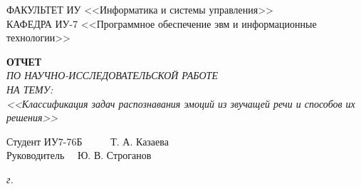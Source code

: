 \begin{titlepage}
	{
		\small \raggedright
		ФАКУЛЬТЕТ ИУ <<Информатика и системы управления>> \\
		\vspace{3.3mm}
		КАФЕДРА ИУ-7 <<Программное обеспечение эвм и информационные технологии>> \\
	}

	\vspace{15.8mm}

	{
		\LARGE \bfseries
		ОТЧЕТ \\
	}
	\vspace{5mm}
	{
		\Large \itshape
		ПО НАУЧНО-ИССЛЕДОВАТЕЛЬСКОЙ РАБОТЕ \\
		\vspace{5mm}
		НА ТЕМУ: \\
		<<Классификация задач распознавания эмоций из звучащей речи и способов их решения>> \\
	}

	\vfill

	Студент \hspace*{2.5cm} ИУ7-76Б \hfill \uline{} ~~~~~Т. А. Казаева~~~~\\
	
	Руководитель \hfill \uline{} 
	~~Ю. В. Строганов~~\\
	
	\vspace{14mm}
	
	\textit{{\the\year} г.}
	
\end{titlepage}